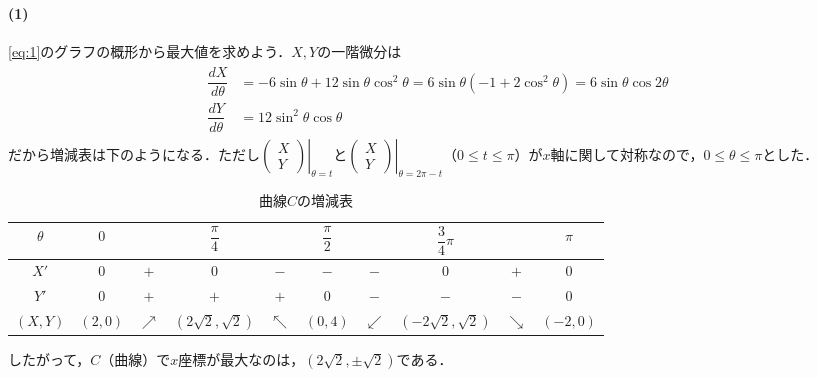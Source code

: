 \documentclass[../../main.tex]{subfiles}
\begin{document}
\paragraph{(1)}

\cref{eq:1}のグラフの概形から最大値を求めよう．$X,Y$の一階微分は
\begin{align}
  \begin{split}
    \dfrac{dX}{d\theta}&=-6\sin\theta + 12\sin\theta\cos^2\theta = 6\sin\theta\left(-1+2\cos^2\theta\right)=6\sin\theta\cos 2\theta \\
    \dfrac{dY}{d\theta}&=12\sin^2\theta\cos\theta
  \end{split}
\end{align}
だから増減表は下のようになる．ただし$\left.
\begin{pmatrix}X\\Y
\end{pmatrix}\right|_{\theta=t}$と$\left.
\begin{pmatrix}X\\Y
\end{pmatrix}\right|_{\theta=2\pi-t}$（$0\le t\le\pi$）が$x$軸に関して対称なので，$0\le\theta\le\pi$とした．

\begin{table}[htb]
  \centering
  \caption{曲線$C$の増減表}
  \begin{tabular}{c|ccccccccc}
    $\theta$ & $0$ & & $\dfrac{\pi}{4}$ & & $\dfrac{\pi}{2}$ & & $\dfrac{3}{4}\pi$ & & $\pi$ \\
    \hline
    $X'$ & $0$ & $+$ & $0$ & $-$ & $-$ & $-$ & $0$ & $+$ & $0$ \\
    \hline
    $Y'$ & $0$ & $+$ & $+$ & $+$ & $0$ & $-$ & $-$ & $-$ & $0$ \\
    \hline
    $(X,Y)$ & $(2,0)$ & $\nearrow$ & $(2\sqrt{2},\sqrt{2})$ & $\nwarrow$ & $(0,4)$ & $\swarrow$ & $(-2\sqrt{2},\sqrt{2})$ & $\searrow$ & $(-2,0)$
  \end{tabular}
\end{table}

したがって，$C$（曲線）で$x$座標が最大なのは，$(2\sqrt{2},\pm\sqrt{2})$である．
\end{document}
